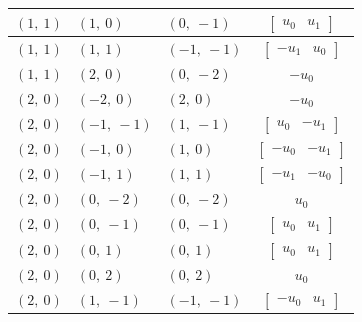 \documentclass[11pt]{article}
\theoremstyle{definition}
\begin{document}
\begin{longtable}{|l|l|l|c|}
    \hline
    $\left( 1, \  1\right)$ & $\left( 1, \  0\right)$ & $\left( 0, \  -1\right)$ & $\left[\begin{matrix}u_{0} & u_{1}\end{matrix}\right]$ \\
    \hline
    $\left( 1, \  1\right)$ & $\left( 1, \  1\right)$ & $\left( -1, \  -1\right)$ & $\left[\begin{matrix}- u_{1} & u_{0}\end{matrix}\right]$ \\
    \hline
    $\left( 1, \  1\right)$ & $\left( 2, \  0\right)$ & $\left( 0, \  -2\right)$ & $- u_{0}$ \\
    \hline
    $\left( 2, \  0\right)$ & $\left( -2, \  0\right)$ & $\left( 2, \  0\right)$ & $- u_{0}$ \\
    \hline
    $\left( 2, \  0\right)$ & $\left( -1, \  -1\right)$ & $\left( 1, \  -1\right)$ & $\left[\begin{matrix}u_{0} & - u_{1}\end{matrix}\right]$ \\
    \hline
    $\left( 2, \  0\right)$ & $\left( -1, \  0\right)$ & $\left( 1, \  0\right)$ & $\left[\begin{matrix}- u_{0} & - u_{1}\end{matrix}\right]$ \\
    \hline
    $\left( 2, \  0\right)$ & $\left( -1, \  1\right)$ & $\left( 1, \  1\right)$ & $\left[\begin{matrix}- u_{1} & - u_{0}\end{matrix}\right]$ \\
    \hline
    $\left( 2, \  0\right)$ & $\left( 0, \  -2\right)$ & $\left( 0, \  -2\right)$ & $u_{0}$ \\
    \hline
    $\left( 2, \  0\right)$ & $\left( 0, \  -1\right)$ & $\left( 0, \  -1\right)$ & $\left[\begin{matrix}u_{0} & u_{1}\end{matrix}\right]$ \\
    \hline
    $\left( 2, \  0\right)$ & $\left( 0, \  1\right)$ & $\left( 0, \  1\right)$ & $\left[\begin{matrix}u_{0} & u_{1}\end{matrix}\right]$ \\
    \hline
    $\left( 2, \  0\right)$ & $\left( 0, \  2\right)$ & $\left( 0, \  2\right)$ & $u_{0}$ \\
    \hline
    $\left( 2, \  0\right)$ & $\left( 1, \  -1\right)$ & $\left( -1, \  -1\right)$ & $\left[\begin{matrix}- u_{0} & u_{1}\end{matrix}\right]$ \\

\end{longtable}
\end{document}
